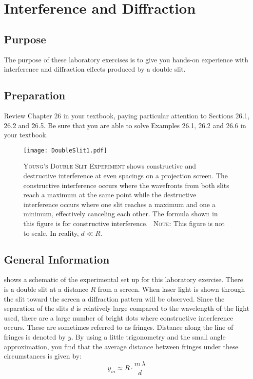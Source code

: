 \chapter{Interference and Diffraction}

\section{Purpose}  The purpose of these laboratory exercises is to give you hands-on experience with interference and diffraction effects produced by a double slit.
\section{Preparation}  Review Chapter 26 in your textbook, paying particular attention to Sections 26.1, 26.2 and 26.5.  Be sure that you are able to solve Examples 26.1, 26.2 and 26.6 in your textbook.


\begin{figure}
	\centering
	\texttt{[image: DoubleSlit1.pdf]}
	\caption[Young's Double Slit Experiment]{\textsc{Young's Double Slit Experiment} shows constructive and destructive interference at even spacings on a projection screen.  The constructive interference occurs where the wavefronts from both slits reach a maximum at the same point while the destructive interference occurs where one slit reaches a maximum and one a minimum, effectively canceling each other.  The formula shown in this figure is for constructive interference.\newline~ \newline\textsc{Note:} This figure is not to scale.  In reality, $d\ll R$.}
	\label{f:fig18}
\end{figure}

\section{General Information}
 shows a schematic of the experimental set up for this laboratory exercise. There is a double slit at a distance $R$ from a screen.  When laser light is shown through the slit toward the screen a diffraction pattern will be observed.  Since the separation of the slits $d$ is relatively large compared to the wavelength  of the light used, there are a large number of bright dots where constructive interference occurs.  These are sometimes referred to as fringes.  Distance along the line of fringes is denoted by $y$. By using a little trigonometry and the small angle approximation, you find that the average distance between fringes under these circumstances is given by: 
\begin{equation} \label{e:deltay}
	y_{m} \approx R  \cdot \frac{m\,\lambda}{d}
\end{equation}

